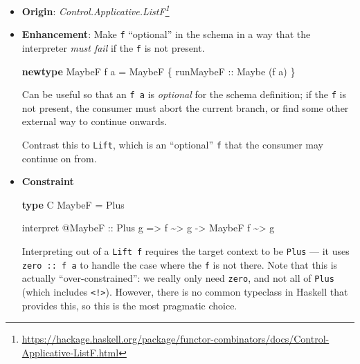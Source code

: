 \documentclass[]{article}
\newenvironment{Shaded}{}{}
\newcommand{\DataTypeTok}[1]{\textcolor[rgb]{0.56,0.13,0.00}{#1}}
\newcommand{\KeywordTok}[1]{\textcolor[rgb]{0.00,0.44,0.13}{\textbf{#1}}}
\newcommand{\NormalTok}[1]{#1}
\newcommand{\OperatorTok}[1]{\textcolor[rgb]{0.40,0.40,0.40}{#1}}
\newcommand{\OtherTok}[1]{\textcolor[rgb]{0.00,0.44,0.13}{#1}}
\renewcommand{\href}[2]{#2\footnote{\url{#1}}}
\begin{document}
\begin{itemize}
\item
  \textbf{Origin}:
  \emph{\href{https://hackage.haskell.org/package/functor-combinators/docs/Control-Applicative-ListF.html}{Control.Applicative.ListF}}
\item
  \textbf{Enhancement}: Make \texttt{f} ``optional'' in the schema in a way that
  the interpreter \emph{must fail} if the \texttt{f} is not present.

\begin{Shaded}
\begin{Highlighting}[]
\KeywordTok{newtype} \DataTypeTok{MaybeF}\NormalTok{ f a }\OtherTok{=} \DataTypeTok{MaybeF}\NormalTok{ \{}\OtherTok{ runMaybeF ::} \DataTypeTok{Maybe}\NormalTok{ (f a) \}}
\end{Highlighting}
\end{Shaded}

  Can be useful so that an \texttt{f\ a} is \emph{optional} for the schema
  definition; if the \texttt{f} is not present, the consumer must abort the
  current branch, or find some other external way to continue onwards.

  Contrast this to \texttt{Lift}, which is an ``optional'' \texttt{f} that the
  consumer may continue on from.
\item
  \textbf{Constraint}

\begin{Shaded}
\begin{Highlighting}[]
\KeywordTok{type} \DataTypeTok{C} \DataTypeTok{MaybeF} \OtherTok{=} \DataTypeTok{Plus}

\NormalTok{interpret }\OperatorTok{@}\DataTypeTok{MaybeF}
\OtherTok{    ::} \DataTypeTok{Plus}\NormalTok{ g}
    \OtherTok{=>}\NormalTok{ f }\OperatorTok{\textasciitilde{}>}\NormalTok{ g}
    \OtherTok{{-}>} \DataTypeTok{MaybeF}\NormalTok{ f }\OperatorTok{\textasciitilde{}>}\NormalTok{ g}
\end{Highlighting}
\end{Shaded}

  Interpreting out of a \texttt{Lift\ f} requires the target context to be
  \texttt{Plus} --- it uses \texttt{zero\ ::\ f\ a} to handle the case where the
  \texttt{f} is not there. Note that this is actually ``over-constrained'': we
  really only need \texttt{zero}, and not all of \texttt{Plus} (which includes
  \texttt{\textless{}!\textgreater{}}). However, there is no common typeclass in
  Haskell that provides this, so this is the most pragmatic choice.
\end{itemize}
\end{document}
